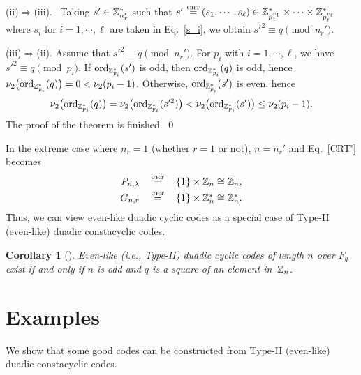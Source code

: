 \documentclass{article}
\newtheorem{Corollary}[Theorem]{Corollary}
\numberwithin{equation}{section}
\numberwithin{table}{section}
\def\Z{{\Bbb Z}}
\def\CRT{\,\mathop{=}\limits^{\mbox{\rm\tiny CRT}}\,}
\begin{document}
(ii)$\Rightarrow$(iii).~ Taking $s'\in\Z_{n_r'}^*$ such that
$s'\CRT(s_1,\cdots,s_\ell)\in
 \Z_{p_1^{v_1}}^*\times\cdots\times\Z_{p_\ell^{v_\ell}}^*$
where $s_i$ for $i=1,\cdots,\ell$ are taken in Eq.~\eqref{s_i},
we obtain $s'^2\equiv q\pmod{n_r'}$.

(iii)$\Rightarrow$(ii). Assume that $s'^2\equiv q\pmod{n_r'}$.
For $p_i$ with $i=1,\cdots,\ell$, we have $s'^2\equiv q\pmod{p_i}$.
If ${\rm ord}_{\Z_{p_i}^*}(s')$ is odd, then
${\rm ord}_{\Z_{p_i}^*}(q)$ is odd, hence
$\nu_2\big({\rm ord}_{\Z_{p_i}^*}(q)\big)=0<\nu_2(p_i-1)$.
Otherwise, ${\rm ord}_{\Z_{p_i}^*}(s')$ is even, hence
$$\nu_2\big({\rm ord}_{\Z_{p_i}^*}(q)\big)
 =\nu_2\big({\rm ord}_{\Z_{p_i}^*}(s'^2)\big)
 <\nu_2\big({\rm ord}_{\Z_{p_i}^*}(s')\big)\le\nu_2(p_i-1).
$$
The proof of the theorem is finished. \qed

\smallskip
In the extreme case where $n_r=1$ (whether $r=1$ or not),
$n=n_r'$ and Eq.~\eqref{CRT'} becomes
\begin{equation*}
\begin{array}{rcl}
P_{n,\lambda}&\CRT & \{1\}\times \Z_{n}\cong \Z_{n},\\[3pt]
G_{n,r}
  &\CRT& \{1\}\times \Z_{n}^*\cong \Z_{n}^*.
\end{array}
\end{equation*}
Thus, we can view even-like duadic cyclic codes as a special case of
Type-II (even-like) duadic constacyclic codes.

\begin{Corollary}[{\cite[Theorem 6.3.2]{HP}}]
Even-like (i.e., Type-II) duadic cyclic codes of length $n$ over $F_q$ exist
if and only if $n$ is odd and $q$ is a square of an element in~$\Z_{n}$.
\end{Corollary}

\section{Examples}

We show that some good codes can be constructed from
Type-II (even-like) duadic constacyclic codes.
\end{document}
